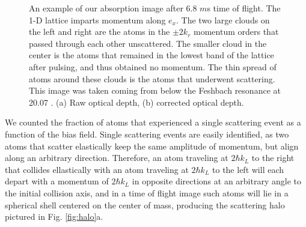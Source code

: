 \documentclass[12pt]{iopart}
\begin{document}
\begin{figure}
\caption{An example of our absorption image after 6.8 $m$s time of flight. The 1-D lattice imparts momentum along $e_x$. The two large clouds on the left and right are the atoms in the $\pm 2k_r$ momentum orders that passed through each other unscattered. The smaller cloud in the center is the atoms that remained in the lowest band of the lattice after pulsing, and thus obtained no momentum. The thin spread of atoms around these clouds is the atoms that underwent scattering.   This image was taken coming from below the Feshbach resonance at 20.07  \mT{}. (a) Raw optical depth, (b) corrected optical depth.}  
\label{fig:SampleCorrection}
\end{figure}
\par We counted the fraction of atoms that experienced a single scattering event as a function of the bias field. Single scattering events are easily identified, as two atoms that scatter elastically keep the same amplitude of momentum, but align along an arbitrary direction. Therefore, an atom traveling at $2 \hbar k_L$ to the right that collides ellastically with an atom traveling at $2 \hbar k_L$ to the left will each depart with a momentum of $2 \hbar k_L$ in opposite directions at an arbitrary angle to the initial collision axis, and in a time of flight image such atoms will lie in a spherical shell centered on the center of mass, producing the scattering halo pictured in Fig. \ref{fig:halo}a. 
\end{document}
